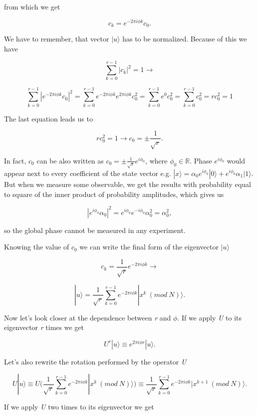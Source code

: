 from which we get

\[ c_k = e^{- 2 \pi i \phi k} c_0.\]

We have to remember, that vector $|u\rangle$ has to be normalized. Because of this we have

\[ \sum_{k = 0}^{r - 1}|c_k|^2 = 1 \rightarrow \]

\[ \sum_{k = 0}^{r - 1}|e^{- 2 \pi i \phi k}c_0|^2 = \sum_{k = 0}^{r - 1}e^{- 2 \pi i \phi k}e^{2 \pi i \phi k} c_0^2 = \sum_{k = 0}^{r - 1}e^{0} c_0^2 = \sum_{k = 0}^{r - 1} c_0^2 = rc_0^2 = 1\]

The last equation leads us to

\[ rc_0^2 = 1 \rightarrow c_0 = \pm \frac{1}{\sqrt{r}}.\]

\begin{remark}
In fact, $c_0$ can be also written as $c_0 = \pm \frac{1}{\sqrt{r}}e^{i \phi_0}$, where $\phi_0 \in \mathbb{R}$. Phase $e^{i \phi_0}$ would appear next to every coefficient of the state vector e.g. $|x\rangle = \alpha_0 e^{i \phi_0} |0\rangle + e^{i \phi_0}\alpha_1|1\rangle$. But when we measure some observable, we get the results with probability equal to square of the inner product of probability amplitudes, which gives us

\[ |e^{i \phi_0}\alpha_0|^2 = e^{i \phi_0}e^{-i \phi_0}\alpha_0^2 = \alpha_0^2,\]

so the global phase cannot be measured in any experiment.
\end{remark}

Knowing the value of $c_0$ we can write the final form of the eigenvector $|u\rangle$

\[ c_k = \frac{1}{\sqrt{r}} e^{-2 \pi i \phi k} \rightarrow \]

\[ |u\rangle = \frac{1}{\sqrt{r}} \sum_{k = 0}^{r - 1} e^{-2 \pi i \phi k} |x^k\ (mod\ N)\rangle.\]

Now let's look closer at the dependence between \textit{r} and $\phi$. If we apply \textit{U} to its eigenvector \textit{r} times we get

\[ U^r|u\rangle \equiv e^{2 \pi i \phi r}|u\rangle.\]

Let's also rewrite the rotation performed by the operator \textit{U}

\[ U|u\rangle \equiv U \bigg( \frac{1}{\sqrt{r}} \sum_{k = 0}^{r - 1} e^{-2 \pi i \phi k} |x^k\ (mod\ N)\rangle \bigg) \equiv \frac{1}{\sqrt{r}} \sum_{k = 0}^{r - 1} e^{-2 \pi i \phi k} |x^{k+1}\ (mod\ N)\rangle. \]

If we apply \textit{U} two times to its eigenvector we get


